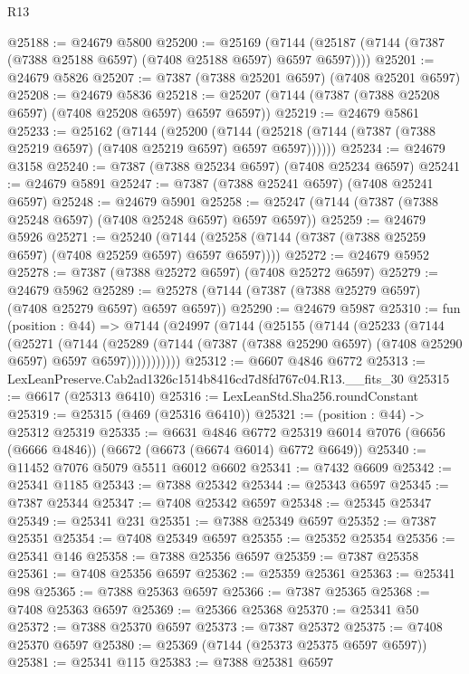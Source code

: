 \begin{lexlean}{R13}
\begin{coremodule}
@25188 := @24679 @5800
@25200 := @25169
    (@7144 (@25187 (@7144 (@7387 (@7388 @25188 @6597) (@7408 @25188 @6597) @6597 @6597))))
@25201 := @24679 @5826
@25207 := @7387 (@7388 @25201 @6597) (@7408 @25201 @6597)
@25208 := @24679 @5836
@25218 := @25207 (@7144 (@7387 (@7388 @25208 @6597) (@7408 @25208 @6597) @6597 @6597))
@25219 := @24679 @5861
@25233 := @25162
    (@7144
      (@25200
        (@7144 (@25218 (@7144 (@7387 (@7388 @25219 @6597) (@7408 @25219 @6597) @6597 @6597))))))
@25234 := @24679 @3158
@25240 := @7387 (@7388 @25234 @6597) (@7408 @25234 @6597)
@25241 := @24679 @5891
@25247 := @7387 (@7388 @25241 @6597) (@7408 @25241 @6597)
@25248 := @24679 @5901
@25258 := @25247 (@7144 (@7387 (@7388 @25248 @6597) (@7408 @25248 @6597) @6597 @6597))
@25259 := @24679 @5926
@25271 := @25240
    (@7144 (@25258 (@7144 (@7387 (@7388 @25259 @6597) (@7408 @25259 @6597) @6597 @6597))))
@25272 := @24679 @5952
@25278 := @7387 (@7388 @25272 @6597) (@7408 @25272 @6597)
@25279 := @24679 @5962
@25289 := @25278 (@7144 (@7387 (@7388 @25279 @6597) (@7408 @25279 @6597) @6597 @6597))
@25290 := @24679 @5987
@25310 := fun (position : @44) =>
  @7144
    (@24997
      (@7144
        (@25155
          (@7144
            (@25233
              (@7144
                (@25271
                  (@7144
                    (@25289
                      (@7144 (@7387 (@7388 @25290 @6597) (@7408 @25290 @6597) @6597 @6597)))))))))))
@25312 := @6607 @4846 @6772
@25313 := LexLeanPreserve.Cab2ad1326c1514b8416cd7d8fd767c04.R13.__fits_30
@25315 := @6617 (@25313 @6410)
@25316 := LexLeanStd.Sha256.roundConstant
@25319 := @25315 (@469 (@25316 @6410))
@25321 := (position : @44) -> @25312 @25319
@25335 := @6631
    @4846
    @6772
    @25319
    @6014
    @7076
    (@6656 (@6666 @4846))
    (@6672 (@6673 (@6674 @6014) @6772 @6649))
@25340 := @11452 @7076 @5079 @5511 @6012 @6602
@25341 := @7432 @6609
@25342 := @25341 @1185
@25343 := @7388 @25342
@25344 := @25343 @6597
@25345 := @7387 @25344
@25347 := @7408 @25342 @6597
@25348 := @25345 @25347
@25349 := @25341 @231
@25351 := @7388 @25349 @6597
@25352 := @7387 @25351
@25354 := @7408 @25349 @6597
@25355 := @25352 @25354
@25356 := @25341 @146
@25358 := @7388 @25356 @6597
@25359 := @7387 @25358
@25361 := @7408 @25356 @6597
@25362 := @25359 @25361
@25363 := @25341 @98
@25365 := @7388 @25363 @6597
@25366 := @7387 @25365
@25368 := @7408 @25363 @6597
@25369 := @25366 @25368
@25370 := @25341 @50
@25372 := @7388 @25370 @6597
@25373 := @7387 @25372
@25375 := @7408 @25370 @6597
@25380 := @25369 (@7144 (@25373 @25375 @6597 @6597))
@25381 := @25341 @115
@25383 := @7388 @25381 @6597

\end{coremodule}
\end{lexlean}
